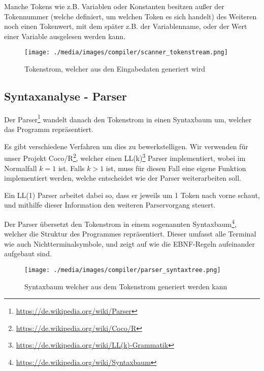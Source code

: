 Manche Tokens wie z.B. Variablen oder Konstanten besitzen au\ss{}er der Tokennummer (welche definiert, um welchen Token es sich handelt) des Weiteren noch einen Tokenwert, mit dem sp\"ater z.B. der Variablenname, oder der Wert einer Variable ausgelesen werden kann.

\begin{figure}[h]
\centering
\texttt{[image: ./media/images/compiler/scanner\_tokenstream.png]}
\caption{Tokenstrom, welcher aus den Eingabedaten generiert wird}
\label{compiler_scanner_tokenstream}
\end{figure}

\subsection{Syntaxanalyse - Parser}
\label{compiler_parser}

Der Parser\footnote{\url{https://de.wikipedia.org/wiki/Parser}} wandelt danach den Tokenstrom in einen Syntaxbaum um, welcher das Programm repräsentiert.

Es gibt verschiedene Verfahren um dies zu bewerkstelligen. Wir verwenden f\"ur unser Projekt Coco/R\footnote{\url{https://de.wikipedia.org/wiki/Coco/R}}, welcher einen LL(k)\footnote{\url{https://de.wikipedia.org/wiki/LL(k)-Grammatik}} Parser implementiert, wobei im Normalfall $k = 1$ ist. Falls $k > 1$ ist, muss f\"ur diesen Fall eine eigene Funktion implementiert werden, welche entscheidet wie der Parser weiterarbeiten soll.

Ein LL(1) Parser arbeitet dabei so, dass er jeweils um 1 Token nach vorne schaut, und mithilfe dieser Information den weiteren Parservorgang steuert.


\newpage


Der Parser \"ubersetzt den Tokenstrom in einem sogenannten Syntaxbaum\footnote{\url{https://de.wikipedia.org/wiki/Syntaxbaum}}, welcher die Struktur des Programmes repr\"asentiert. Dieser umfasst alle Terminal wie auch Nichtterminalsymbole, und zeigt auf wie die EBNF-Regeln aufeinander aufgebaut sind.

\begin{figure}[h]
\centering
\texttt{[image: ./media/images/compiler/parser\_syntaxtree.png]}
\caption{Syntaxbaum welcher aus dem Tokenstrom generiert werden kann}
\label{compiler_parser_syntaxtree}
\end{figure}


